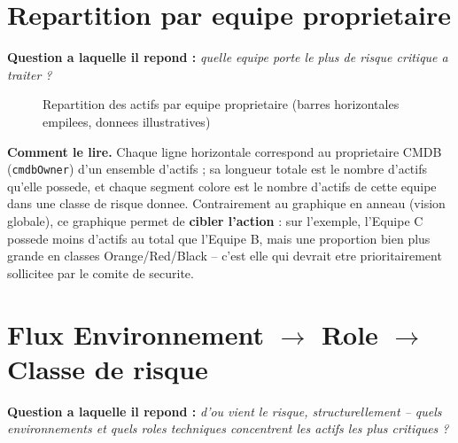 \section{Repartition par equipe proprietaire}

\textbf{Question a laquelle il repond :} \emph{quelle equipe porte le plus de risque
critique a traiter ?}

\begin{figure}[H]
\centering
{}
\caption{Repartition des actifs par equipe proprietaire (barres horizontales empilees, donnees illustratives)}
\label{fig:chart-owner}
\end{figure}

\textbf{Comment le lire.} Chaque ligne horizontale correspond au proprietaire CMDB
(\texttt{cmdbOwner}) d'un ensemble d'actifs ; sa longueur totale est le nombre
d'actifs qu'elle possede, et chaque segment colore est le nombre d'actifs de cette
equipe dans une classe de risque donnee. Contrairement au graphique en anneau
(vision globale), ce graphique permet de \textbf{cibler l'action} : sur l'exemple,
l'Equipe C possede moins d'actifs au total que l'Equipe B, mais une proportion bien
plus grande en classes Orange/Red/Black -- c'est elle qui devrait etre prioritairement
sollicitee par le comite de securite.

\section{Flux Environnement \texorpdfstring{$\to$}{->} Role \texorpdfstring{$\to$}{->} Classe de risque}

\textbf{Question a laquelle il repond :} \emph{d'ou vient le risque, structurellement
-- quels environnements et quels roles techniques concentrent les actifs les plus
critiques ?}

